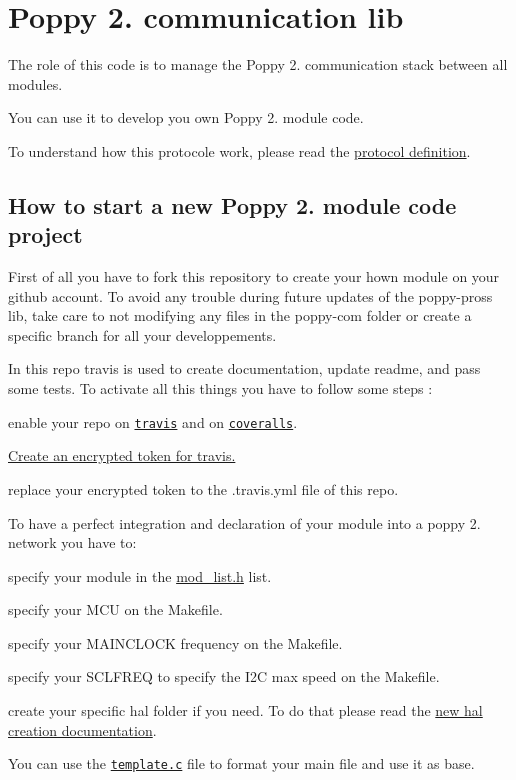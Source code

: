 \section*{Poppy 2. communication lib }

The role of this code is to manage the Poppy 2. communication stack between all modules.

You can use it to develop you own Poppy 2. module code.

To understand how this protocole work, please read the \hyperlink{md_doc_protocol_definition}{protocol definition}.

\subsection*{How to start a new Poppy 2. module code project }





First of all you have to fork this repository to create your hown module on your github account. To avoid any trouble during future updates of the poppy-\/pross lib, take care to not modifying any files in the poppy-\/com folder or create a specific branch for all your developpements. 



In this repo travis is used to create documentation, update readme, and pass some tests. To activate all this things you have to follow some steps \-:
\begin{DoxyItemize}
\item enable your repo on \href{https://travis-ci.org/}{\tt travis} and on \href{https://coveralls.io}{\tt coveralls}.
\item \hyperlink{md_doc_travis_encrypt}{Create an encrypted token for travis.}
\item replace your encrypted token to the .travis.\-yml file of this repo.
\end{DoxyItemize}





To have a perfect integration and declaration of your module into a poppy 2. network you have to\-:
\begin{DoxyItemize}
\item specify your module in the \hyperlink{mod__list_8h_source}{mod\-\_\-list.\-h} list.
\item specify your M\-C\-U on the Makefile.
\item specify your M\-A\-I\-N\-C\-L\-O\-C\-K frequency on the Makefile.
\item specify your S\-C\-L\-F\-R\-E\-Q to specify the I2\-C max speed on the Makefile.
\item create your specific hal folder if you need. To do that please read the \hyperlink{md_doc_hal_creation}{new hal creation documentation}.
\end{DoxyItemize}

You can use the \href{template.c}{\tt template.\-c} file to format your main file and use it as base. 